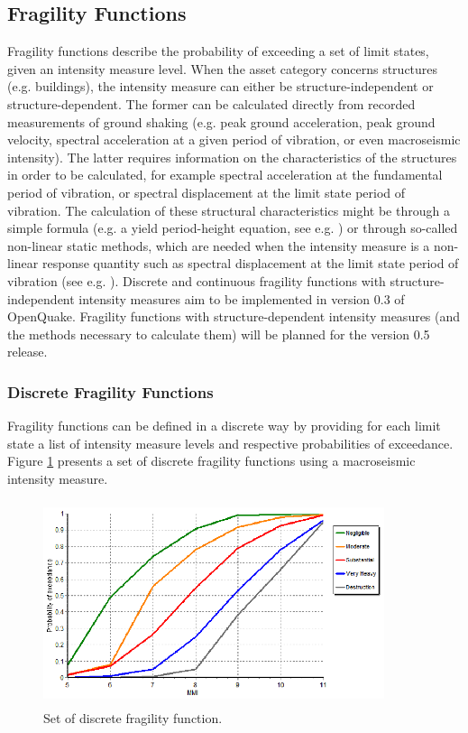\subsection{Fragility Functions}
Fragility functions describe the probability of exceeding a set of limit states, given an intensity measure level. When the asset category concerns structures (e.g. buildings), the intensity measure can either be structure-independent or structure-dependent. The former can be calculated directly from recorded measurements of ground shaking (e.g. peak ground acceleration, peak ground velocity, spectral acceleration at a given period of vibration, or even macroseismic intensity). The latter requires information on the characteristics of the structures in order to be calculated, for example spectral acceleration at the fundamental period of vibration, or spectral displacement at the limit state period of vibration. The calculation of these structural characteristics might be through a simple formula (e.g. a yield period-height equation, see e.g. \citet{CrowleyPinho2004} ) or through so-called non-linear static methods, which are needed when the intensity measure is a non-linear response quantity such as spectral displacement at the limit state period of vibration (see e.g. \citet{FEMA440ATC2005}).
Discrete and continuous fragility functions with structure-independent intensity measures aim to be implemented in version 0.3 of OpenQuake. Fragility functions with structure-dependent intensity measures (and the methods necessary to calculate them) will be planned for the version 0.5 release.

\subsubsection{Discrete Fragility Functions}
Fragility functions can be defined in a discrete way by providing for each limit state a list of intensity measure levels and respective probabilities of exceedance. Figure \ref{fig:FFDiscrete} presents a set of discrete fragility functions using a macroseismic intensity measure.

\begin{figure}[ht]
\centering
\includegraphics[width=10cm,height=6cm]{./Figures/Part_Risk/FFDiscrete.eps}
\caption{Set of discrete fragility function.}
\label{fig:FFDiscrete}
\end{figure}

